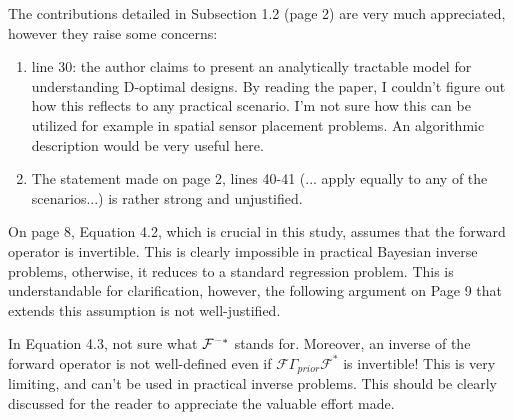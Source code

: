 \documentclass{amsart}
\begin{document}
The contributions detailed in Subsection 1.2 (page 2) are very much
appreciated, however they raise some concerns:

\begin{enumerate}
\item line 30: the author claims to present an analytically tractable
  model for understanding D-optimal designs. By reading the paper, I
  couldn't figure out how this reflects to any practical scenario. I'm
  not sure how this can be utilized for example in spatial sensor
  placement problems. An algorithmic description would be very useful
  here.

\item The statement made on page 2, lines 40-41 (... apply equally to
  any of the scenarios...) is rather strong and unjustified.
\end{enumerate}

On page 8, Equation 4.2, which is crucial in this study, assumes that
the forward operator is invertible. This is clearly impossible in
practical Bayesian inverse problems, otherwise, it reduces to a
standard regression problem. This is understandable for clarification,
however, the following argument on Page 9 that extends this assumption
is not well-justified.
%


In Equation 4.3, not sure what $\mathcal{F}^{-*}$ stands for. Moreover, an
inverse of the forward operator is not well-defined even if
$\mathcal{F}\Gamma_{prior}\mathcal{F}^*$ is invertible! This is very
limiting, and can't be used in practical inverse problems. This should
be clearly discussed for the reader to appreciate the valuable effort
made.
\end{document}
